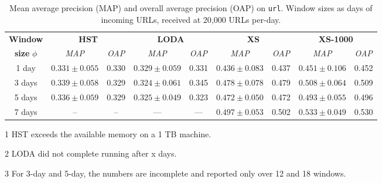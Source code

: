 \documentclass[11pt,onecolumn]{article}
\begin{document}
\begin{table}[!hbtp]
    \centering
    \begin{threeparttable}
    \begin{tabular}{ccccccccc}
    \toprule
    \textbf{Window} & \multicolumn{2}{c}{\textbf{HST}} & \multicolumn{2}{c}{\textbf{LODA\tnote{3}}} & \multicolumn{2}{c}{\textbf{XS}} & \multicolumn{2}{c}{\textbf{XS-1000}} \\
    \textbf{size} $\phi$ & \textit{MAP} & \textit{OAP} & \textit{MAP}& \textit{OAP}     & \textit{MAP} & \textit{OAP} & \textit{MAP} & \textit{OAP}	\\
    \midrule
    1 day  & $0.331 \pm 0.055$  & 0.330  & $0.329 \pm 0.059$ & 0.331 & $0.436 \pm 0.083$ & 0.437 & $0.451 \pm 0.106$ & 0.452 \\
    3 days & $0.339 \pm 0.058$  & 0.329  & $0.324 \pm 0.061$ & 0.345   & $0.478 \pm 0.078$ & 0.479 & $0.508 \pm 0.064$ & 0.509\\
    5 days & $0.336 \pm 0.059$  & 0.329  & $0.325 \pm 0.049$ & 0.323   & $0.472 \pm 0.050$ & 0.472 & $0.493 \pm 0.055$ & 0.496 \\
    7 days\tnote{1,2} & --                  & --      & ---        & ---          & $0.497 \pm 0.053$ & 0.502 & $0.533 \pm 0.049$ & 0.530 \\
    \bottomrule
    \end{tabular}
    \caption{Mean average precision (MAP) and overall average precision (OAP) on \texttt{url}. Window sizes as days of incoming URLs, received at 20,000 URLs per-day.}
    \begin{tablenotes}
    \item[1] HST exceeds the available memory on a 1 TB machine.
    \item[2] LODA did not complete running after x days.
    \item[3] For 3-day and 5-day, the numbers are incomplete and reported only over 12 and 18 windows.
    \end{tablenotes}
    \end{threeparttable}
\end{table}

\printbibliography
\end{document}
